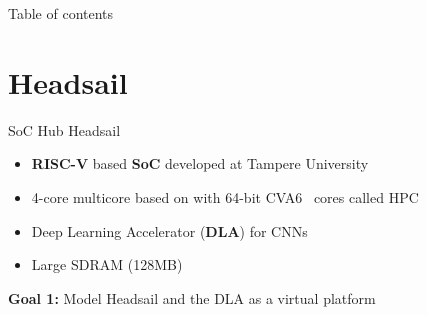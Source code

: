 %
%
\def\checkmark{\tikz\fill[scale=0.4](0,.35) -- (.25,0) -- (1,.7) -- (.25,.15) -- cycle;}
\def\scalecheck{\resizebox{\widthof{\checkmark}*\ratio{\widthof{x}}{\widthof{\normalsize x}}}{!}{\checkmark}}

\begin{frame}
\titlepage
\end{frame}


\begin{frame}{Table of contents}
\tableofcontents
\end{frame}
\section{Headsail}
\begin{frame}{SoC Hub Headsail}
  \begin{itemize}
          \item \textbf{RISC-V} based \textbf{SoC} developed at Tampere University
          \item 4-core multicore based on with 64-bit CVA6~\cite{zaruba2019costCVA6} cores called HPC
          \item Deep Learning Accelerator (\textbf{DLA}) for CNNs
          \item Large SDRAM (128MB)
  \end{itemize}
  \vfill
  \textbf{Goal 1:} Model Headsail and the DLA as a virtual platform
\end{frame}

